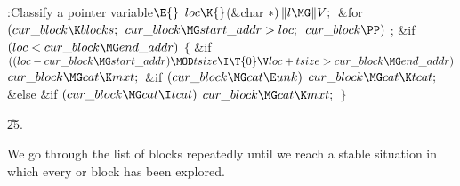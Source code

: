 \Y\B\4:Classify a pointer variable\X${}\E{}$\6
$\\{loc}\K{}$(\&{char} ${}{*})\,\|l\MG\|V;{}$\6
\&{for} ${}(\\{cur\_block}\K\\{blocks};{}$ ${}\\{cur\_block}\MG\\{start\_addr}>%
\\{loc};{}$ ${}\\{cur\_block}\PP){}$\1\5
;\2\6
\&{if} ${}(\\{loc}<\\{cur\_block}\MG\\{end\_addr}){}$\5
${}\{{}$\1\6
\&{if} ${}((\\{loc}-\\{cur\_block}\MG\\{start\_addr})\MOD\\{tsize}\I\T{0}\V%
\\{loc}+\\{tsize}>\\{cur\_block}\MG\\{end\_addr}){}$\1\5
${}\\{cur\_block}\MG\\{cat}\K\\{mxt};{}$\2\6
\&{if} ${}(\\{cur\_block}\MG\\{cat}\E\\{unk}){}$\1\5
${}\\{cur\_block}\MG\\{cat}\K\\{tcat};{}$\2\6
\&{else} \&{if} ${}(\\{cur\_block}\MG\\{cat}\I\\{tcat}){}$\1\5
${}\\{cur\_block}\MG\\{cat}\K\\{mxt};{}$\2\6
\4${}\}{}$\2\par
\U25.\fi

We go through the list of blocks repeatedly until we reach a stable
situation in which every  or  block has been explored.

